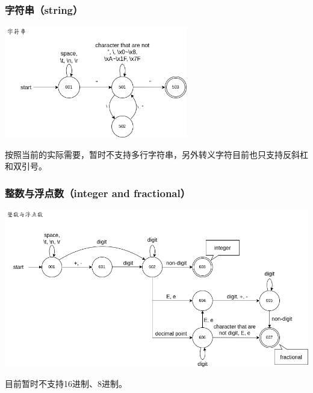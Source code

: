 \subsubsection{字符串（string）}
\noindent\includegraphics[width=0.6\textwidth]{images/状态转换图之字符串.png}

按照当前的实际需要，暂时不支持多行字符串，另外转义字符目前也只支持反斜杠和双引号。


\subsubsection{整数与浮点数（integer and fractional）}
\noindent\includegraphics[width=\textwidth]{images/状态转换图之整数与浮点数.png}

目前暂时不支持16进制、8进制。


